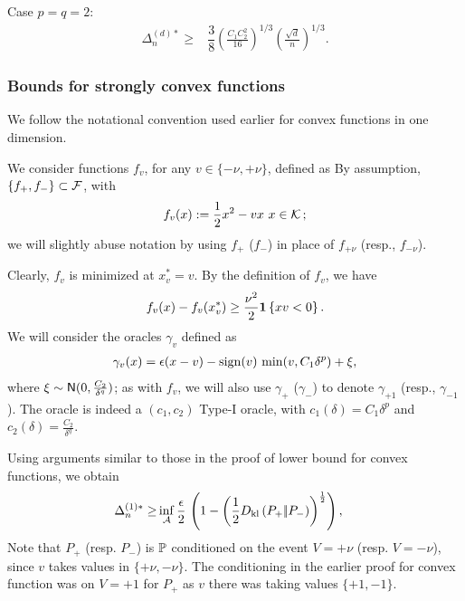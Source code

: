Case $p=q=2$:
\begin{align*}
\Delta_n^{(d)*}  \ge& \dfrac{3}{8}\left(\frac{  C_1 C_2^2}{16 }\right)^{1/3} \left(\frac{ \sqrt{d} }{ n}\right)^{1/3}.
\end{align*}


\subsubsection{Bounds for strongly convex functions}
We follow the notational convention used earlier for convex functions in one dimension. 

We consider functions $f_v$, for any $v \in \{-\nu,+\nu\}$, defined as
By assumption,  $\{f_+, f_-\}\subset \F$, with 
\begin{align*}
  f_v(x) := \dfrac{1}{2} x^2 - v x \,\, x \in \cK\,;
\end{align*}
we will slightly abuse notation by using $f_+$ ($f_-$) in place of $f_{+\nu}$ (resp., $f_{-\nu}$).

Clearly, $f_v$ is minimized at $x^*_v = v$.
By the definition of $f_v$, we have
\begin{align}
  f_v(x) - f_v(x^*_v)
\ge  \dfrac{\nu^2}{2}  \indic{x v  < 0}. \label{eq:fv-lb-sc}
\end{align}
We will consider the oracles $\gamma_v$ defined as 
\begin{align}
 \gamma_v(x) = \epsilon(x-v) - \sign(v)\, \min(v,C_1 \delta^p) + \xi, \label{eq:oracle-1d}
\end{align}
where $\xi \sim \normal(0,\frac{C_2}{\delta^q})$; as with $f_v$, we will also use $\gamma_{+}$ ($\gamma_-$) 
to denote $\gamma_{+1}$ (resp., $\gamma_{-1}$).
The oracle is indeed a $(c_1,c_2)$ Type-I oracle, with $c_1(\delta)=C_1\delta^p$ and $c_2(\delta)=\frac{C_2}{\delta^q}$.

Using arguments similar to those in the proof of lower bound for convex functions, we obtain
\begin{align}
\Delta_n^{(1)*} %
  \ge  &\inf_{\A} \dfrac{\epsilon }{2}  \,\left( 1 - \left(\frac12\dkl{P_{+}}{P_{-}}\right)^{\frac{1}{2}}\right), \label{eq:pinskersc}
\end{align}
Note that $P_+$ (resp. $P_-$) is $\P$ conditioned on the event $V=+\nu$ (resp. $V=-\nu$), since $v$ takes values in $\{+\nu,-\nu\}$. The conditioning in the earlier proof for convex function was on $V=+1$ for $P_+$ as $v$ there was taking values $\{+1,-1\}$.

